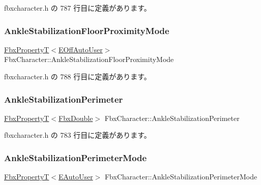  fbxcharacter.\+h の 787 行目に定義があります。

\mbox{\label{class_fbx_character_a57748d04f64d5abb209b202c4fe49726}} 
\subsubsection{\texorpdfstring{Ankle\+Stabilization\+Floor\+Proximity\+Mode}{AnkleStabilizationFloorProximityMode}}
{\footnotesize\ttfamily \hyperlink{class_fbx_property_t}{Fbx\+PropertyT}$<$\hyperlink{class_fbx_character_ab698a180e6f900ba8317257749c2ecce}{E\+Off\+Auto\+User}$>$ Fbx\+Character\+::\+Ankle\+Stabilization\+Floor\+Proximity\+Mode}



 fbxcharacter.\+h の 788 行目に定義があります。

\mbox{\label{class_fbx_character_af18107f4ccd81a9d9f85f61814e77a0c}} 
\subsubsection{\texorpdfstring{Ankle\+Stabilization\+Perimeter}{AnkleStabilizationPerimeter}}
{\footnotesize\ttfamily \hyperlink{class_fbx_property_t}{Fbx\+PropertyT}$<$\hyperlink{fbxtypes_8h_a171e72a1c46fc15c1a6c9c31948c1c5b}{Fbx\+Double}$>$ Fbx\+Character\+::\+Ankle\+Stabilization\+Perimeter}



 fbxcharacter.\+h の 783 行目に定義があります。

\mbox{\label{class_fbx_character_a311b4f7bef7007a17612aae9c9d1542d}} 
\subsubsection{\texorpdfstring{Ankle\+Stabilization\+Perimeter\+Mode}{AnkleStabilizationPerimeterMode}}
{\footnotesize\ttfamily \hyperlink{class_fbx_property_t}{Fbx\+PropertyT}$<$\hyperlink{class_fbx_character_a5b03462709a82a15d89ee4563a4c49df}{E\+Auto\+User}$>$ Fbx\+Character\+::\+Ankle\+Stabilization\+Perimeter\+Mode}



